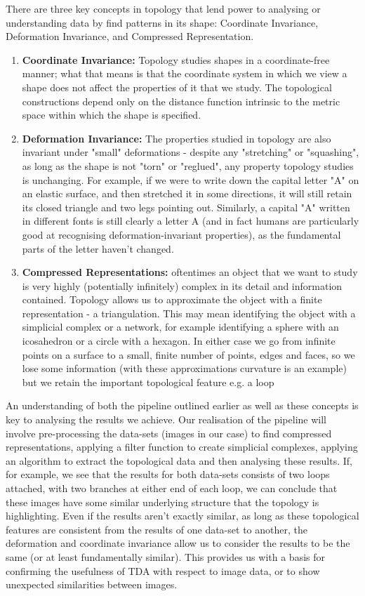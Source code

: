 \documentclass[a4paper]{article}
\begin{document}
There are three key concepts in topology that lend power to analysing or understanding data by find patterns in its shape: Coordinate Invariance, Deformation Invariance, and Compressed Representation.

\begin{enumerate}
\item \textbf{Coordinate Invariance:} Topology studies shapes in a coordinate-free manner; what that means is that the coordinate system in which we view a shape does not affect the properties of it that we study. The topological constructions depend only on the distance function intrinsic to the metric space within which the shape is specified.
\item \textbf{Deformation Invariance:} The properties studied in topology are also invariant under "small" deformations - despite any "stretching" or "squashing", as long as the shape is not "torn" or "reglued", any property topology studies is unchanging. For example, if we were to write down the capital letter "A" on an elastic surface, and then stretched it in some directions, it will still retain its closed triangle and two legs pointing out. Similarly, a capital "A" written in different fonts is still clearly a letter A (and in fact humans are particularly good at recognising deformation-invariant properties), as the fundamental parts of the letter haven't changed.
\item \textbf{Compressed Representations:} oftentimes an object that we want to study is very highly (potentially infinitely) complex in its detail and information contained. Topology allows us to approximate the object with a finite representation - a triangulation. This may mean identifying the object with a simplicial complex or a network, for example identifying a sphere with an icosahedron or a circle with a hexagon. In either case we go from infinite points on a surface to a small, finite number of points, edges and faces, so we lose some information (with these approximations curvature is an example) but we retain the important topological feature e.g. a loop
\end{enumerate}

An understanding of both the pipeline outlined earlier as well as these concepts is key to analysing the results we achieve. Our realisation of the pipeline will involve pre-processing the data-sets (images in our case) to find compressed representations, applying a filter function to create simplicial complexes, applying an algorithm to extract the topological data and then analysing these results. If, for example, we see that the results for both data-sets consists of two loops attached, with two branches at either end of each loop, we can conclude that these images have some similar underlying structure that the topology is highlighting. Even if the results aren't exactly similar, as long as these topological features are consistent from the results of one data-set to another, the deformation and coordinate invariance allow us to consider the results to be the same (or at least fundamentally similar). This provides us with a basis for confirming the usefulness of TDA with respect to image data, or to show unexpected similarities between images.
\end{document}
